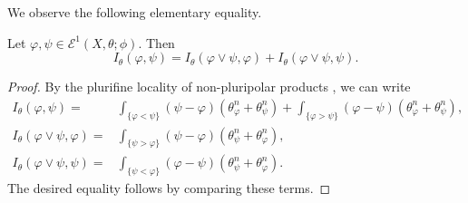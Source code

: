 We observe the following elementary equality.
\begin{lemma}\label{lma:I_equal_Imaxsum}
    Let $\varphi,\psi\in \mathcal{E}^1(X,\theta;\phi)$. Then
    \[
    I_{\theta}(\varphi,\psi)=I_{\theta}(\varphi\lor \psi,\varphi)+I_{\theta}(\varphi\lor \psi,\psi).
    \]
\end{lemma}
\begin{proof}
    By the plurifine locality of non-pluripolar products , we can write
    \[
    \begin{aligned}
         I_{\theta}(\varphi,\psi)=&\int_{ \{\varphi<\psi\}} (\psi-\varphi) \left( \theta_{\varphi}^n+\theta_{\psi}^n \right)+\int_{ \{\varphi>\psi\}} (\varphi-\psi) \left( \theta_{\varphi}^n+\theta_{\psi}^n \right),\\
         I_{\theta}(\varphi\lor \psi,\varphi)=& \int_{\{\psi>\varphi\}} (\psi-\varphi)\left(\theta_{\psi}^n+\theta_{\varphi}^n \right),\\
         I_{\theta}(\varphi\lor \psi,\psi)=& \int_{\{\psi<\varphi\}} (\varphi-\psi)\left(\theta_{\psi}^n+\theta_{\varphi}^n \right).
    \end{aligned}
    \]
    The desired equality follows by comparing these terms.
\end{proof}

